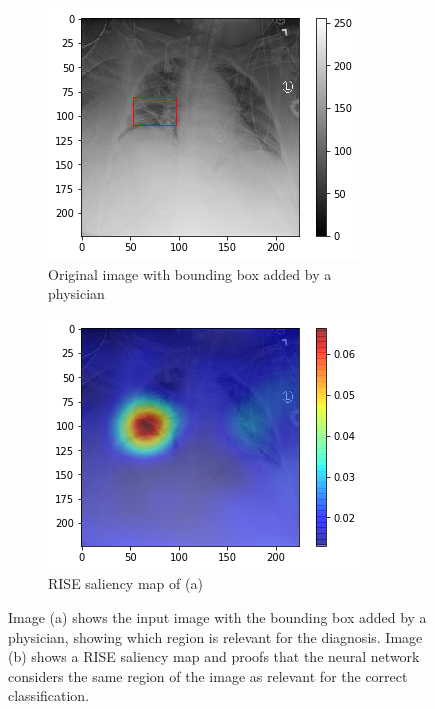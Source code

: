 \begin{figure}[H]
    \centering
    \begin{subfigure}[t]{.45\textwidth}
        \centering
        \includegraphics[width=\linewidth]{chapters/03_classification/images/rise0_bbox.png}
        \caption{Original image with bounding box added by a physician}
    \end{subfigure}\hspace{1cm}%
    \begin{subfigure}[t]{.45\textwidth}
        \centering
        \includegraphics[width=\linewidth]{chapters/03_classification/images/rise0_saliency.png}
        \caption{RISE saliency map of (a)}
    \end{subfigure}
    \caption{Image (a) shows the input image with the bounding box added by a physician, showing which region is relevant for the diagnosis. Image (b) shows a RISE saliency map and proofs that the neural network considers the same region of the image as relevant for the correct classification.}
    \label{rise_example_1}
\end{figure}

